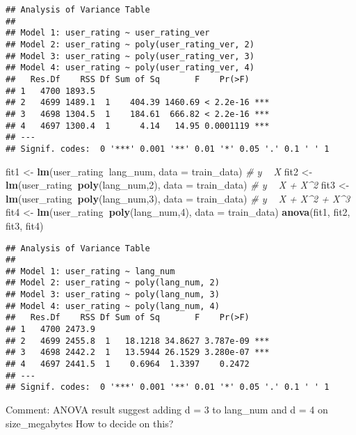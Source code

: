 \documentclass[]{article}
\newenvironment{Shaded}{\begin{snugshade}}{\end{snugshade}}
\newcommand{\KeywordTok}[1]{\textcolor[rgb]{0.13,0.29,0.53}{\textbf{#1}}}
\newcommand{\DataTypeTok}[1]{\textcolor[rgb]{0.13,0.29,0.53}{#1}}
\newcommand{\DecValTok}[1]{\textcolor[rgb]{0.00,0.00,0.81}{#1}}
\newcommand{\StringTok}[1]{\textcolor[rgb]{0.31,0.60,0.02}{#1}}
\newcommand{\CommentTok}[1]{\textcolor[rgb]{0.56,0.35,0.01}{\textit{#1}}}
\newcommand{\OperatorTok}[1]{\textcolor[rgb]{0.81,0.36,0.00}{\textbf{#1}}}
\newcommand{\NormalTok}[1]{#1}
\begin{document}
\begin{verbatim}
## Analysis of Variance Table
## 
## Model 1: user_rating ~ user_rating_ver
## Model 2: user_rating ~ poly(user_rating_ver, 2)
## Model 3: user_rating ~ poly(user_rating_ver, 3)
## Model 4: user_rating ~ poly(user_rating_ver, 4)
##   Res.Df    RSS Df Sum of Sq       F    Pr(>F)    
## 1   4700 1893.5                                   
## 2   4699 1489.1  1    404.39 1460.69 < 2.2e-16 ***
## 3   4698 1304.5  1    184.61  666.82 < 2.2e-16 ***
## 4   4697 1300.4  1      4.14   14.95 0.0001119 ***
## ---
## Signif. codes:  0 '***' 0.001 '**' 0.01 '*' 0.05 '.' 0.1 ' ' 1
\end{verbatim}

\begin{Shaded}
\begin{Highlighting}[]
\NormalTok{fit1 <-}\StringTok{ }\KeywordTok{lm}\NormalTok{(user_rating}\OperatorTok{~}\NormalTok{lang_num, }\DataTypeTok{data =}\NormalTok{ train_data)  }\CommentTok{# y ~ X }
\NormalTok{fit2 <-}\StringTok{ }\KeywordTok{lm}\NormalTok{(user_rating}\OperatorTok{~}\KeywordTok{poly}\NormalTok{(lang_num,}\DecValTok{2}\NormalTok{), }\DataTypeTok{data =}\NormalTok{ train_data) }\CommentTok{# y ~ X + X^2}
\NormalTok{fit3 <-}\StringTok{ }\KeywordTok{lm}\NormalTok{(user_rating}\OperatorTok{~}\KeywordTok{poly}\NormalTok{(lang_num,}\DecValTok{3}\NormalTok{), }\DataTypeTok{data =}\NormalTok{ train_data) }\CommentTok{# y ~ X + X^2 + X^3}
\NormalTok{fit4 <-}\StringTok{ }\KeywordTok{lm}\NormalTok{(user_rating}\OperatorTok{~}\KeywordTok{poly}\NormalTok{(lang_num,}\DecValTok{4}\NormalTok{), }\DataTypeTok{data =}\NormalTok{ train_data)}
\KeywordTok{anova}\NormalTok{(fit1, fit2, fit3, fit4)}
\end{Highlighting}
\end{Shaded}

\begin{verbatim}
## Analysis of Variance Table
## 
## Model 1: user_rating ~ lang_num
## Model 2: user_rating ~ poly(lang_num, 2)
## Model 3: user_rating ~ poly(lang_num, 3)
## Model 4: user_rating ~ poly(lang_num, 4)
##   Res.Df    RSS Df Sum of Sq       F    Pr(>F)    
## 1   4700 2473.9                                   
## 2   4699 2455.8  1   18.1218 34.8627 3.787e-09 ***
## 3   4698 2442.2  1   13.5944 26.1529 3.280e-07 ***
## 4   4697 2441.5  1    0.6964  1.3397    0.2472    
## ---
## Signif. codes:  0 '***' 0.001 '**' 0.01 '*' 0.05 '.' 0.1 ' ' 1
\end{verbatim}

Comment: ANOVA result suggest adding d = 3 to lang\_num and d = 4 on
size\_megabytes How to decide on this?
\end{document}
